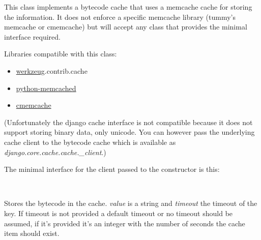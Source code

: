 \documentclass[a4paper,10pt,english]{sphinxmanual}
\begin{document}

\begin{fulllineitems}
\label{api:jinja2.MemcachedBytecodeCache}
This class implements a bytecode cache that uses a memcache cache for
storing the information.  It does not enforce a specific memcache library
(tummy's memcache or cmemcache) but will accept any class that provides
the minimal interface required.

Libraries compatible with this class:
\begin{itemize}
\item {} 
\href{http://werkzeug.pocoo.org/}{werkzeug}.contrib.cache

\item {} 
\href{http://www.tummy.com/Community/software/python-memcached/}{python-memcached}

\item {} 
\href{http://gijsbert.org/cmemcache/}{cmemcache}

\end{itemize}

(Unfortunately the django cache interface is not compatible because it
does not support storing binary data, only unicode.  You can however pass
the underlying cache client to the bytecode cache which is available
as \emph{django.core.cache.cache.\_client}.)

The minimal interface for the client passed to the constructor is this:

\begin{fulllineitems}
\label{api:jinja2.MemcachedBytecodeCache.MinimalClientInterface}~

\begin{fulllineitems}
\label{api:jinja2.MemcachedBytecodeCache.MinimalClientInterface.set}
Stores the bytecode in the cache.  \emph{value} is a string and
\emph{timeout} the timeout of the key.  If timeout is not provided
a default timeout or no timeout should be assumed, if it's
provided it's an integer with the number of seconds the cache
item should exist.


\end{fulllineitems}
\end{fulllineitems}
\end{fulllineitems}
\end{document}
